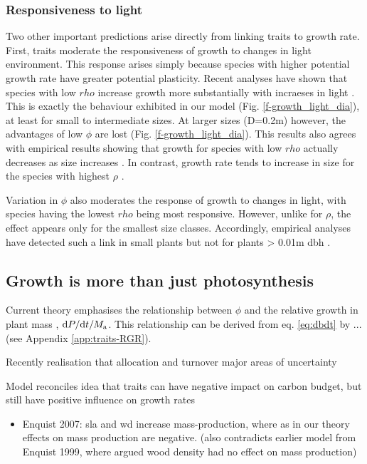 \documentclass[a4paper,11pt]{article}
\begin{document}
\subsubsection{Responsiveness to light}

Two other important predictions arise directly from linking traits to
growth rate. First, traits moderate the
responsiveness of growth to changes in light environment. This response
arises simply because species with higher potential growth rate have
greater potential plasticity. Recent analyses have shown that species
with low $rho$ increase growth more substantially with incraeses in
light \citep{Ruger-2012}. This is exactly the behaviour
exhibited in our model (Fig. \ref{f-growth_light_dia}), at least for small
to intermediate sizes. At larger sizes (D=0.2m) however, the advantages
of low $\phi$ are lost (Fig. \ref{f-growth_light_dia}). This results also
agrees with empirical results showing that growth for species with low
$rho$ actually decreases as size
increases \citep{Ruger-2012}. In contrast, growth rate tends
to increase in size for the species with highest
$\rho$ \citep{Ruger-2012}.


Variation in $\phi$ also moderates the response of growth to changes
in light, with species having the lowest $rho$ being most responsive.
However, unlike for $\rho$, the effect appears only for the smallest
size classes. Accordingly, empirical analyses have detected such a link
in small plants but not for plants \textgreater{} 0.01m
dbh \citep{Ruger-2012}.

\subsection{Growth is more than just photosynthesis}\label{tree-growth-is-more-than-just-photosynthesis}

Current theory emphasises the relationship between $\phi$ and the relative growth in plant mass
\citep{Lambers-1992, Cornelissen-1996, Wright-2000, Enquist-2007},
${\rm d}P / {\rm d}t / M_{\rm a}$. This relationship can be derived from eq. \ref{eq:dbdt}  by ...
(see Appendix \ref{app:traits-RGR}).

Recently realisation that allocation and turnover major areas of
uncertainty

Model reconciles idea that traits can have negative impact on carbon
budget, but still have positive influence on growth rates

\begin{itemize}
\itemsep1pt\parskip0pt
\item
  Enquist 2007: sla and wd increase mass-production, where as in our
  theory effects on mass production are negative. (also contradicts
  earlier model from Enquist 1999, where argued wood density had no
  effect on mass production)
\end{itemize}
\end{document}
